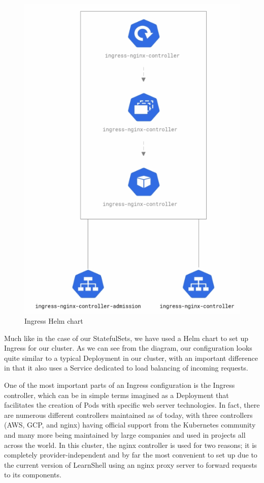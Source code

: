 \documentclass[thesis=B,english]{FITthesis}[2019/12/23]
\begin{document}
\begin{figure}[H]
\centering
\caption{Ingress Helm chart}
\hspace*{-1cm}
\includegraphics[scale=0.6]{ingress-diagram}
\end{figure}

Much like in the case of our StatefulSets, we have used a Helm chart to set up Ingress for our cluster. As we can see from the diagram, our configuration looks quite similar to a typical Deployment in our cluster, with an important difference in that it also uses a Service dedicated to load balancing of incoming requests.

One of the most important parts of an Ingress configuration is the Ingress controller, which can be in simple terms imagined as a Deployment that facilitates the creation of Pods with specific web server technologies. In fact, there are numerous different controllers maintained as of today, with three controllers (AWS, GCP, and nginx) having official support from the Kubernetes community and many more being maintained by large companies and used in projects all across the world. In this cluster, the nginx controller is used for two reasons; it is completely provider-independent and by far the most convenient to set up due to the current version of LearnShell using an nginx proxy server to forward requests to its components.
\end{document}

